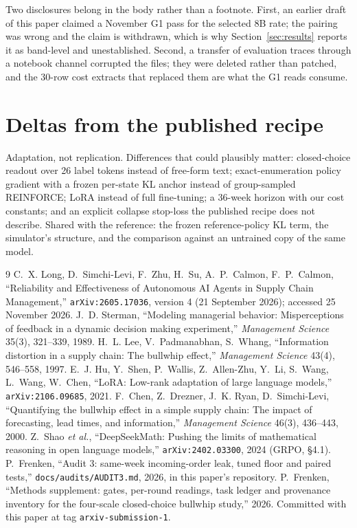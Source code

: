 \documentclass[11pt]{article}
\begin{document}
Two disclosures belong in the body rather than a footnote. First, an earlier draft of this paper
claimed a November G1 pass for the selected 8B rate; the pairing was wrong and the claim is withdrawn,
which is why Section~\ref{sec:results} reports it as band-level and unestablished. Second, a transfer of
evaluation traces through a notebook channel corrupted the files; they were deleted rather than patched,
and the 30-row cost extracts that replaced them are what the G1 reads consume.

\appendix
\section{Deltas from the published recipe}\label{app:deltas}

Adaptation, not replication. Differences that could plausibly matter: closed-choice readout over 26
label tokens instead of free-form text; exact-enumeration policy gradient with a frozen per-state KL
anchor instead of group-sampled REINFORCE; LoRA instead of full fine-tuning; a 36-week horizon with our
cost constants; and an explicit collapse stop-loss the published recipe does not describe. Shared with
the reference: the frozen reference-policy KL term, the simulator's structure, and the comparison
against an untrained copy of the same model.

\begin{thebibliography}{9}\itemsep 0pt
 C.~X. Long, D.~Simchi-Levi, F.~Zhu, H.~Su, A.~P.~Calmon,
F.~P.~Calmon, ``Reliability and Effectiveness of Autonomous AI Agents in Supply Chain
Management,'' \texttt{arXiv:2605.17036}, version 4 (21 September 2026); accessed 25 November 2026.
 J.~D. Sterman, ``Modeling managerial behavior: Misperceptions of feedback in a
dynamic decision making experiment,'' \emph{Management Science} 35(3), 321--339, 1989.
 H.~L. Lee, V.~Padmanabhan, S.~Whang, ``Information distortion in a supply chain: The
bullwhip effect,'' \emph{Management Science} 43(4), 546--558, 1997.
 E.~J. Hu, Y.~Shen, P.~Wallis, Z.~Allen-Zhu, Y.~Li, S.~Wang, L.~Wang, W.~Chen,
``LoRA: Low-rank adaptation of large language models,'' \texttt{arXiv:2106.09685}, 2021.
 F.~Chen, Z.~Drezner, J.~K. Ryan, D.~Simchi-Levi, ``Quantifying the bullwhip effect in
a simple supply chain: The impact of forecasting, lead times, and information,''
\emph{Management Science} 46(3), 436--443, 2000.
 Z.~Shao \emph{et al.}, ``DeepSeekMath: Pushing the limits of mathematical reasoning in
open language models,'' \texttt{arXiv:2402.03300}, 2024 (GRPO, \S4.1).
 P.~Frenken, ``Audit 3: same-week incoming-order leak, tuned floor and paired tests,''
\texttt{docs/audits/AUDIT3.md}, 2026, in this paper's repository.
 P.~Frenken, ``Methods supplement: gates, per-round readings, task ledger and
provenance inventory for the four-scale closed-choice bullwhip study,'' 2026. Committed with this
paper at tag \texttt{arxiv-submission-1}.
\end{thebibliography}
\end{document}
